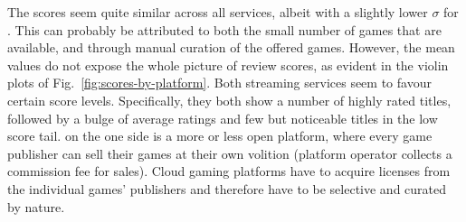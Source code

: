 The scores seem quite similar across all services, albeit with a slightly lower $\sigma$ for \gfnow. This can probably be attributed to both the small number of games that are available, and through manual curation of the offered games. However, the mean values do not expose the whole picture of review scores, as evident in the violin plots of Fig.~\ref{fig:scores-by-platform}. Both streaming services seem to favour certain score levels. Specifically, they both show a number of highly rated titles, followed by a bulge of average ratings and few but noticeable titles in the low score tail. %
\steam on the one side is a more or less open platform, where every game publisher can sell their games at their own volition (platform operator collects a commission fee for sales). Cloud gaming platforms have to acquire licenses from the individual games' publishers and therefore have to be selective and curated by nature.
